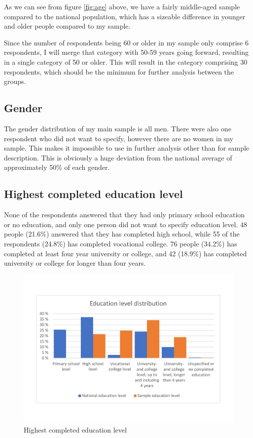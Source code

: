 As we can see from figure \ref{fig:age} above, we have a fairly middle-aged sample compared to the national population, which has a sizeable difference in younger and older people compared to my sample. 

Since the number of respondents being 60 or older in my sample only comprise 6 respondents, I will merge that category with 50-59 years going forward, resulting in a single category of 50 or older. This will result in the category comprising 30 respondents, which should be the minimum for further analysis between the groups. 

\subsection{Gender}
The gender distribution of my main sample is all men. There were also one respondent who did not want to specify, however there are no women in my sample. This makes it impossible to use in further analysis other than for sample description. This is obviously a huge deviation from the national average of approximately 50\% of each gender. 


\subsection{Highest completed education level}
None of the respondents answered that they had only primary school education or no education, and only one person did not want to specify education level. 48 people (21.6\%) answered that they has completed high school, while 55 of the respondents (24.8\%) has completed vocational college. 76 people (34.2\%) has completed at least four year university or college, and 42 (18.9\%) has completed university or college for longer than four years. 

\begin{figure}[H]
    \centering
    \includegraphics[scale=0.45]{figures/diagrams/education_ssb.pdf}
    \caption{Highest completed education level}
    \label{fig:education}
\end{figure}

